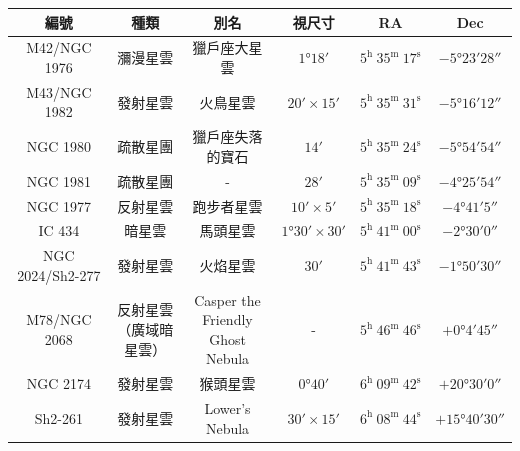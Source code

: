\begin{center}
\begin{longtable}{c | c | c | c | c | c}
    編號 & 種類 & 別名 & 視尺寸 & RA & Dec \\
    \hline
    \endfirsthead


    \endfoot

    \endlastfoot

    M42/NGC 1976 & 瀰漫星雲 & 獵戶座大星雲 & \(\ang{1;18;}\) & \(5^\text{h }35^\text{m }17^\text{s}\) & \(-\ang{5;23;28}\) \\
    M43/NGC 1982 & 發射星雲 & 火鳥星雲 & \(\ang{;20;}\times\ang{;15;}\) & \(5^\text{h }35^\text{m }31^\text{s}\) & \(-\ang{5;16;12}\) \\
    NGC 1980 & 疏散星團 & 獵戶座失落的寶石 & \(\ang{;14;}\) & \(5^\text{h }35^\text{m }24^\text{s}\) & \(-\ang{5;54;54}\) \\
    NGC 1981 & 疏散星團 & - & \(\ang{;28;}\) & \(5^\text{h }35^\text{m }09^\text{s}\) & \(-\ang{4;25;54}\) \\
    NGC 1977 & 反射星雲 & 跑步者星雲 & \(\ang{;10;}\times\ang{;5;}\) & \(5^\text{h }35^\text{m }18^\text{s}\) & \(-\ang{4;41;5}\)\\
    IC 434 & 暗星雲 & 馬頭星雲 & \(\ang{1;30;}\times\ang{;30;}\) & \(5^\text{h }41^\text{m }00^\text{s}\) & \(-\ang{2;30;0}\) \\
    NGC 2024/Sh2-277 & 發射星雲 & 火焰星雲 & \(\ang{;30;}\) & \(5^\text{h }41^\text{m }43^\text{s}\) & \(-\ang{1;50;30}\) \\
    M78/NGC 2068 & \makecell{反射星雲\\（廣域暗星雲）} & \makecell{Casper the Friendly\\Ghost Nebula} & - & \(5^\text{h }46^\text{m }46^\text{s}\) & \(+\ang{0;4;45}\) \\
    NGC 2174 & 發射星雲 & 猴頭星雲 & \(\ang{0;40;}\) & \(6^\text{h }09^\text{m }42^\text{s}\) & \(+\ang{20;30;0}\) \\
    Sh2-261 & 發射星雲 & Lower's Nebula & \(\ang{;30;}\times\ang{;15;}\) & \(6^\text{h }08^\text{m }44^\text{s}\) & \(+\ang{15;40;30}\)
\end{longtable}
\end{center}


